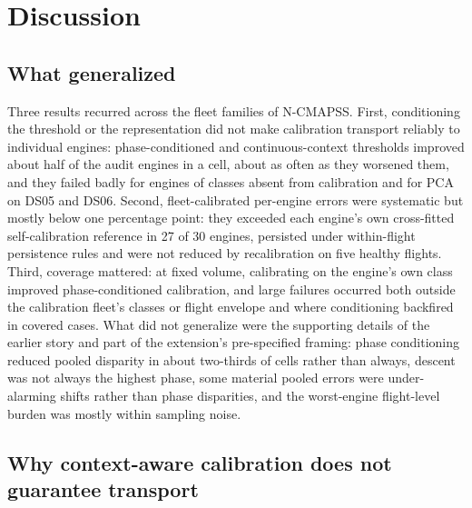 \documentclass[preprint,11pt,a4paper]{elsarticle}
\begin{document}
\section{Discussion}

\subsection{What generalized}

Three results recurred across the fleet families of N-CMAPSS. First, conditioning the threshold or the representation did not make calibration transport reliably to individual engines: phase-conditioned and continuous-context thresholds improved about half of the audit engines in a cell, about as often as they worsened them, and they failed badly for engines of classes absent from calibration and for PCA on DS05 and DS06. Second, fleet-calibrated per-engine errors were systematic but mostly below one percentage point: they exceeded each engine's own cross-fitted self-calibration reference in 27 of 30 engines, persisted under within-flight persistence rules and were not reduced by recalibration on five healthy flights. Third, coverage mattered: at fixed volume, calibrating on the engine's own class improved phase-conditioned calibration, and large failures occurred both outside the calibration fleet's classes or flight envelope and where conditioning backfired in covered cases. What did not generalize were the supporting details of the earlier story and part of the extension's pre-specified framing: phase conditioning reduced pooled disparity in about two-thirds of cells rather than always, descent was not always the highest phase, some material pooled errors were under-alarming shifts rather than phase disparities, and the worst-engine flight-level burden was mostly within sampling noise.

\subsection{Why context-aware calibration does not guarantee transport}
\end{document}
